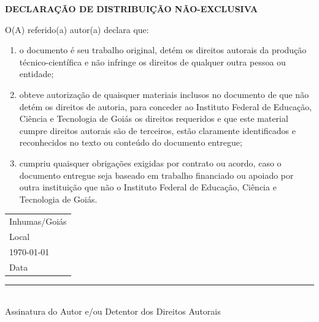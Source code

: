 \noindent
\begin{center}
	{\bfseries\large DECLARAÇÃO DE DISTRIBUIÇÃO NÃO-EXCLUSIVA}
\end{center}

\vspace{1cm}

O(A) referido(a) autor(a) declara que:

\vspace{0.5cm}

\begin{enumerate}[label=\roman*.]
	\item o documento é seu trabalho original, detém os direitos autorais da produção técnico-científica e não infringe os direitos de qualquer outra pessoa ou entidade;
	
	\item obteve autorização de quaisquer materiais inclusos no documento de que não detém os direitos de autoria, para conceder ao Instituto Federal de Educação, Ciência e Tecnologia de Goiás os direitos requeridos e que este material cumpre direitos autorais são de terceiros, estão claramente identificados e reconhecidos no texto ou conteúdo do documento entregue;
	
	\item cumpriu quaisquer obrigações exigidas por contrato ou acordo, caso o documento entregue seja baseado em trabalho financiado ou apoiado por outra instituição que não o Instituto Federal de Educação, Ciência e Tecnologia de Goiás.
\end{enumerate}

\vspace{1cm}

\noindent
\begin{tabular}{p{16cm}}
    Inhumas/Goiás \\[0.1cm]
    Local \\[1cm]
    \today \\[0.1cm]
    Data
\end{tabular}


\vspace{2cm}

\noindent\rule{10cm}{0.4pt} \\[0.5cm]
\noindent Assinatura do Autor e/ou Detentor dos Direitos Autorais
